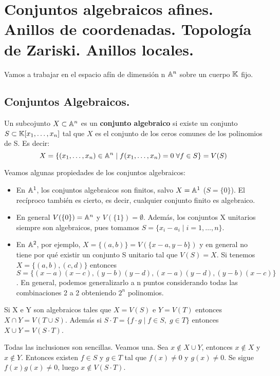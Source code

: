 \documentclass[ACGA.tex]{subfiles}
\begin{document}
\chapter{Conjuntos algebraicos afines. Anillos de coordenadas. Topología de Zariski. Anillos locales.}
Vamos a trabajar en el espacio afín de dimensión n $\mathbb{A}^n$ sobre un cuerpo $\mathbb{K}$ fijo. 
\section{Conjuntos Algebraicos.}
\begin{defi}
Un subcojunto $X\subset \mathbb{A}^n$ es un \textbf{conjunto algebraico} si existe un conjunto $S\subset \mathbb{K}[x_1,\dotsc,x_n]$ tal que $X$ es el conjunto de los ceros comunes de los polinomios de S. Es decir:
\[
X=\{(x_1,\dotsc,x_n)\in\mathbb{A}^n\mid f(x_1,\dotsc,x_n)=0\;\forall f\in S\}=V(S)
\]
\end{defi}
\begin{prop}Veamos algunas propiedades de los conjuntos algebraicos:
\begin{itemize}
\item En $\mathbb{A}^1$, los conjuntos algebraicos son finitos, salvo $X=\mathbb{A}^1$ ($S=\{0\}$). El recíproco también es cierto, es decir, cualquier conjunto finito es algebraico.
\item En general $V(\{0\})=\mathbb{A}^n$ y $V(\{1\})=\emptyset$. Además, los conjuntos X unitarios siempre son algebraicos, pues tomamos $S=\{x_i-a_i\mid i=1,\dotsc,n\}$.
\item En $\mathbb{A}^2$, por ejemplo, $X=\{(a,b)\} = V(\{x-a,y-b\})$ y en general no tiene por qué existir un conjunto S unitario tal que $V(S)=X$. Si tenemos $X=\{(a,b),(c,d)\}$ entonces $S=\{(x-a)(x-c),(y-b)(y-d), (x-a)(y-d), (y-b)(x-c)\}$. En general, podemos generalizarlo a n puntos considerando todas las combinaciones 2 a 2 obteniendo $2^n$ polinomios.
\end{itemize}
\end{prop}
\begin{prop}
Si X e Y son algebraicos tales que $X=V(S)$ e $Y=V(T)$ entonces $X\cap Y = V(T\cup S)$. Además si $S\cdot T = \{f\cdot g \mid f \in S,\; g \in T\}$ entonces $X\cup Y = V(S\cdot T)$. 
\end{prop}
\begin{dem}
Todas las inclusiones son sencillas. Veamos una. Sea $x\notin X\cup Y$, entonces $x\notin X$ y $x\notin Y$. Entonces existen $f\in S$ y $g\in T$ tal que $f(x)\neq 0$ y $g(x)\neq 0$. Se sigue $f(x)g(x)\neq 0$, luego $x\notin V(S\cdot T)$. \QED
\end{dem}
\end{document}
